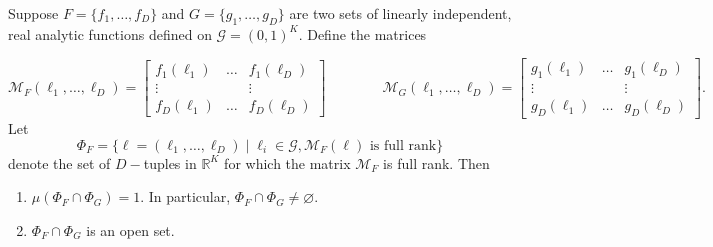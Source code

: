 \begin{lemma} \label{lemma:overlapping_li_zero}
    Suppose $F = \{ f_1, \ldots, f_D\}$ and $G = \{g_1, \ldots, g_D \}$ are two sets of linearly independent, real analytic functions defined on $\mathcal{G} = (0, 1)^K$. Define the matrices

    \begin{equation}
        \mathcal{M}_F(\ell_1, \ldots, \ell_D) = \begin{bmatrix}
            f_1(\ell_1) & \ldots & f_1(\ell_D) \\
            \vdots & & \vdots\\
            f_D(\ell_1) & \ldots & f_D(\ell_D) 
        \end{bmatrix} \qquad \qquad \mathcal{M}_G(\ell_1, \ldots, \ell_D) = \begin{bmatrix}
            g_1(\ell_1) & \ldots & g_1(\ell_D) \\
            \vdots & & \vdots\\
            g_D(\ell_1) & \ldots & g_D(\ell_D)
        \end{bmatrix}. \label{eqn:matrices_defn}
    \end{equation}
    Let 
    \begin{equation}
     \Phi_{F} = \{ \mathbf{\boldsymbol \ell} = (\ell_1, \ldots, \ell_D) \mid {\ell}_i \in \mathcal{G}, \mathcal{M}_F(\mathbf{\boldsymbol \ell}) \text{ is full rank}\} \label{eqn:phi_definition}   
    \end{equation}
     denote the set of $D-$tuples in $\mathbb{R}^{K}$ for which the matrix $\mathcal{M}_F$ is full rank. Then 
     \begin{enumerate}
         \item $\mu(\Phi_{F} \cap \Phi_{G}) = 1$. In particular, $\Phi_{F}\cap \Phi_{G} \neq \varnothing$.
         \item $\Phi_F \cap \Phi_G$ is an open set. 
     \end{enumerate} 
\end{lemma}
